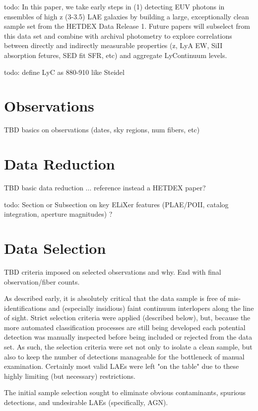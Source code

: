 \documentclass{aastex62}
\begin{document}
{ \color{red} todo:  In this paper, we take early steps in (1) detecting EUV photons in ensembles of high z (3-3.5) LAE galaxies by building a large, exceptionally clean sample set from the HETDEX Data Release 1. Future papers will subselect from this data set and combine with archival photometry to explore correlations between directly and indirectly measurable properties (z, LyA EW, SiII absorption fetures, SED fit SFR, etc) and aggregate LyContinuum levels.}

{ \color{red} todo: define LyC as 880-910 like Steidel}

\section{Observations} \label{sec:obs}

TBD basics on observations (dates, sky regions, num fibers, etc)

\section{Data Reduction} \label{sec:reduction}

TBD basic data reduction ... reference instead a HETDEX paper?

{ \color{red} todo: Section or Subsection on key ELiXer features (PLAE/POII, catalog integration, aperture magnitudes) ?}

\section{Data Selection} \label{sec:selection}

TBD criteria imposed on selected observations and why. End with final observation/fiber counts.

As described early, it is absolutely critical that the data sample is free of mis-identifications and (especially insidious) faint continuum interlopers along the line of sight. Strict selection criteria were applied (described below), but, because the more automated classification processes are still being developed each potential detection was manually inspected before being included or rejected from the data set. As such, the selection criteria were set not only to isolate a clean sample, but also to keep the number of detections manageable for the bottleneck of manual examination. Certainly most valid LAEs were left "on the table" due to these highly limiting (but necessary) restrictions. 

The initial sample selection sought to eliminate obvious contaminants, spurious detections, and undesirable LAEs (specifically, AGN).
\end{document}
